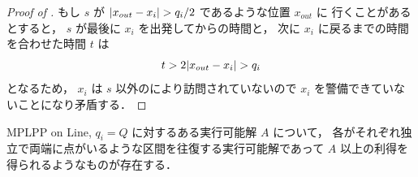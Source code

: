 \begin{proof}[Proof of ]
	もし $s$ が $|{ x_{out} - x_i }| > q_i /2$ であるような位置 $x_{out}$ に
	行くことがあるとすると，
	$s$ が最後に $x_i$ を出発してからの時間と，
	次に $x_i$ に戻るまでの時間を合わせた時間 $t$ は
	\begin{equation}
		t > 2 |{ x_{out} - x_i}| > q_i
	\end{equation}
	となるため，
	$x_i$ は $s$ 以外の\server により訪問されていないので
	$x_i$ を警備できていないことになり矛盾する．
\end{proof}



\begin{lemm}
	\label{lemm:MPLPPonLine_2}
	MPLPP on Line, $q_i = Q$ に対するある実行可能解 $A$ について，
	各\server がそれぞれ独立で両端に点がいるような区間を往復する実行可能解であって
	$A$ 以上の利得を得られるようなものが存在する．
\end{lemm}

